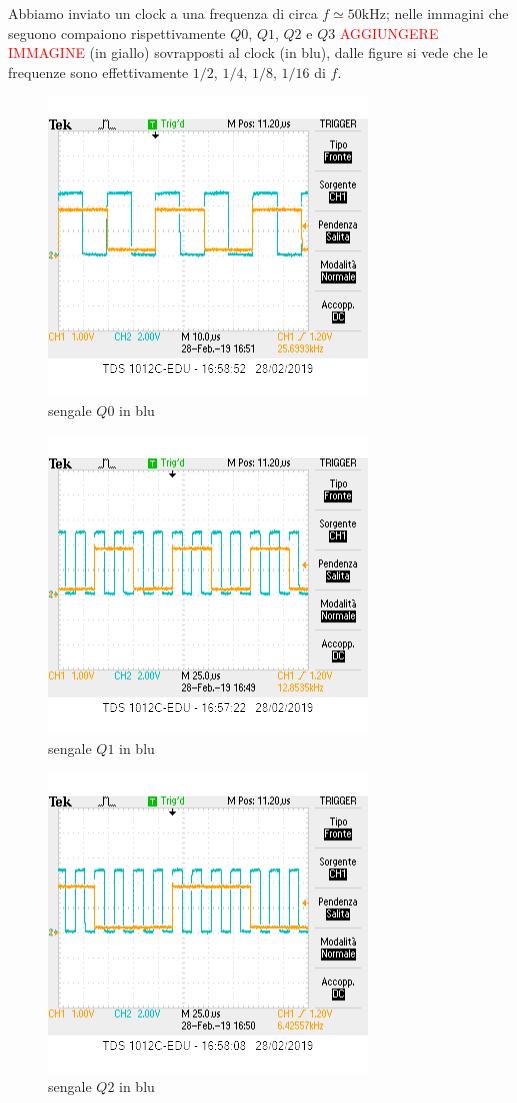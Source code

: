 \documentclass[10pt,a4paper]{article}
\begin{document}
Abbiamo inviato un clock a una frequenza di circa $f\simeq 50 \si{\kilo \hertz}$; nelle immagini che seguono compaiono  rispettivamente $Q0$, $Q1$, $Q2$ e $Q3$ \textcolor{red}{AGGIUNGERE IMMAGINE} (in giallo) sovrapposti al clock (in blu), dalle figure si vede che le frequenze sono effettivamente $1/2$, $1/4$, $1/8$, $1/16$ di $f$.
\begin{figure}[h]
			\centering
			\includegraphics[scale=0.85]{1mezzo}
			\caption{sengale $Q0$ in blu}
			\label{fig:plh}
\end{figure}
\begin{figure}[h]
			\centering
			\includegraphics[scale=0.85]{1quarto}
			\caption{sengale $Q1$ in blu}
			\label{fig:plh}
\end{figure}
\begin{figure}[h]
			\centering
			\includegraphics[scale=0.85]{1ottavo}
			\caption{sengale $Q2$ in blu}
			\label{fig:plh}
\end{figure}
\end{document}
